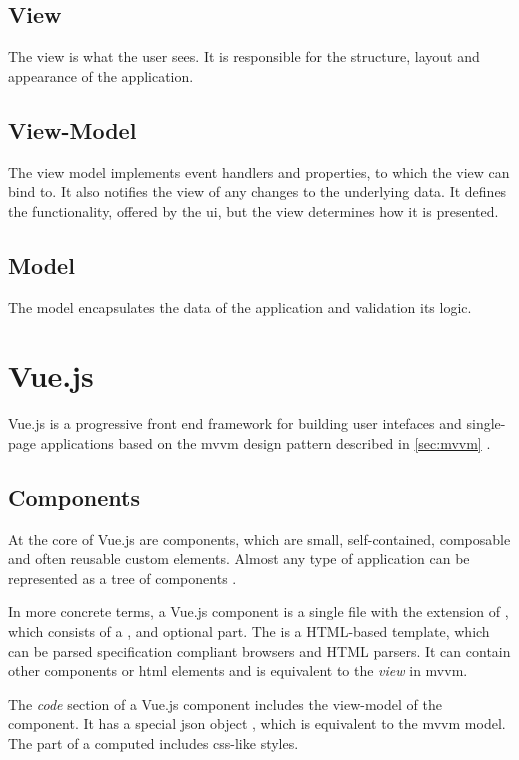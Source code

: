 \subsection{View}
The view is what the user sees. It is responsible for the structure, layout and appearance of the application.
\subsection{View-Model}
The view model implements event handlers and properties, to which the view can bind to. It also notifies the view of any changes to the underlying data. It defines the functionality, offered by the \gls{ui}, but the view determines how it is presented. 
\subsection{Model}
The model encapsulates the data of the application and validation its logic.


\section{Vue.js}

Vue.js \parencite{vuejs_gh} is a progressive front end framework for building user intefaces and single-page applications based on the \gls{mvvm} design pattern described in \ref{sec:mvvm} \parencite{vuejs_book} \parencite{vuejs_guide}.  

\subsection{Components}
At the core of Vue.js are components, which are small, self-contained, composable and often reusable custom elements. Almost any type of application can be represented as a tree of components \parencite{vuejs_guide}. 

In more concrete terms, a Vue.js component is a single file with the extension of , which consists of a ,  and optional  part. The  is a HTML-based template, which can be parsed specification compliant browsers and HTML parsers. It can contain other components or html elements and is equivalent to the \textit{view} in \gls{mvvm}. 

The \textit{code} section of a Vue.js component includes the view-model of the component. It has a special json object , which is equivalent to the \gls{mvvm} model. %
The  part of a computed includes css-like styles.


